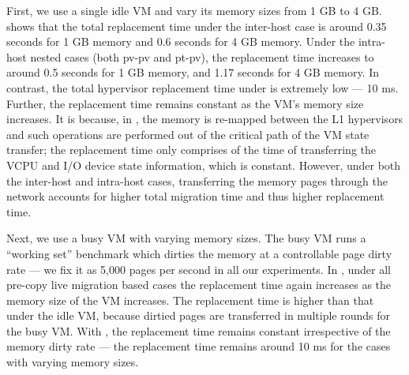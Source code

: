  First, we use a single idle VM and vary its memory sizes from 1 GB to 4 GB.  shows that the total replacement time under the inter-host case is around 0.35 seconds for 1 GB memory and 0.6 seconds for 4 GB memory. Under the intra-host nested cases (both pv-pv and pt-pv), the replacement time increases to around 0.5 seconds for 1 GB memory, and 1.17 seconds for 4 GB memory. In contrast, the total hypervisor replacement time under \arch is extremely low --- 10 ms. Further, the replacement time remains constant as the VM's memory size increases. It is because, in \arch, the memory is re-mapped between the L1 hypervisors and such operations are performed out of the critical path of the VM state transfer; the replacement time only comprises of the time of transferring the VCPU and I/O device state information, which is constant. 
However, under both the inter-host and intra-host cases, transferring the memory pages through the network accounts for higher total migration time and thus higher replacement time. 

Next, we use a busy VM with varying memory sizes. The busy VM runs a ``working set'' benchmark which dirties the memory at a controllable page dirty rate --- we fix it as 5,000 pages per second in all our experiments.
In , under all pre-copy live migration based cases the replacement time again increases as the memory size of the VM increases. The replacement time is higher than that under the idle VM, because dirtied pages are transferred in multiple rounds for the busy VM.
With \arch, the replacement time remains constant irrespective of the memory dirty rate --- the replacement time remains around 10 ms for the cases with varying memory sizes.

